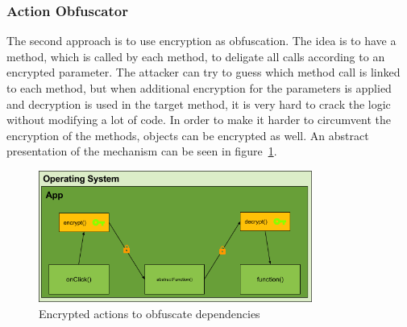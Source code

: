 \subsubsection{Action Obfuscator} \label{subsubsectionection:counter-replace-encryption-content-obfuscator}
The second approach is to use encryption as obfuscation.
The idea is to have a method, which is called by each method, to deligate all calls according to an encrypted parameter.
The attacker can try to guess which method call is linked to each method, but when additional encryption for the parameters is applied and decryption is used in the target method, it is very hard to crack the logic without modifying a lot of code.
In order to make it harder to circumvent the encryption of the methods, objects can be encrypted as well.
An abstract presentation of the mechanism can be seen in figure~\ref{fig:encryptionAction}.

\begin{figure}[h]
    \centering
    \includegraphics[width=0.8\textwidth]{data/encryptionAction.png}
    \caption{Encrypted actions to obfuscate dependencies}
    \label{fig:encryptionAction}
\end{figure}
